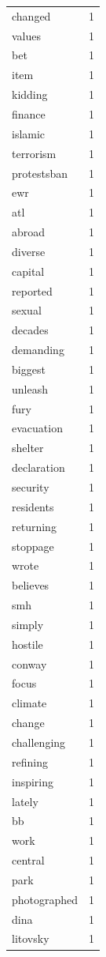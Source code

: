 \begin{tabular}{lr}
changed & 1 \\
values & 1 \\
bet & 1 \\
item & 1 \\
kidding & 1 \\
finance & 1 \\
islamic & 1 \\
terrorism & 1 \\
protestsban & 1 \\
ewr & 1 \\
atl & 1 \\
abroad & 1 \\
diverse & 1 \\
capital & 1 \\
reported & 1 \\
sexual & 1 \\
decades & 1 \\
demanding & 1 \\
biggest & 1 \\
unleash & 1 \\
fury & 1 \\
evacuation & 1 \\
shelter & 1 \\
declaration & 1 \\
security & 1 \\
residents & 1 \\
returning & 1 \\
stoppage & 1 \\
wrote & 1 \\
believes & 1 \\
smh & 1 \\
simply & 1 \\
hostile & 1 \\
conway & 1 \\
focus & 1 \\
climate & 1 \\
change & 1 \\
challenging & 1 \\
refining & 1 \\
inspiring & 1 \\
lately & 1 \\
bb & 1 \\
work & 1 \\
central & 1 \\
park & 1 \\
photographed & 1 \\
dina & 1 \\
litovsky & 1 \\

\end{tabular}
